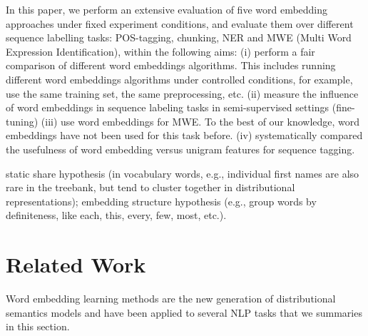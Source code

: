 \documentclass[11pt]{article}
\begin{document}


In this paper, we perform an extensive evaluation of five word embedding approaches under fixed experiment conditions, and evaluate them over different sequence labelling tasks: POS-tagging, chunking, 
NER and MWE (Multi Word Expression Identification), 
within the following aims:
(i) perform a fair comparison of different word embeddings
algorithms. This includes running different word embeddings algorithms under controlled conditions, for example, use the same training set, the same preprocessing, etc.
(ii) measure the influence of word embeddings in sequence labeling tasks in semi-supervised settings (fine-tuning)
(iii) use word embeddings for MWE. To the best of our knowledge, 
word embeddings have not been used for this task before.
(iv) systematically compared the usefulness of word embedding versus
unigram features for sequence tagging.


static share hypothesis (in vocabulary words, e.g., individual first names are also rare in the treebank, but tend to cluster together in distributional representations);
embedding structure hypothesis (e.g., group words by definiteness, like each, this, every, few, most, etc.).




\section{Related Work}
Word embedding learning methods are the new generation of distributional semantics models and have been applied to several 
NLP tasks that we summaries in this section.
\end{document}
